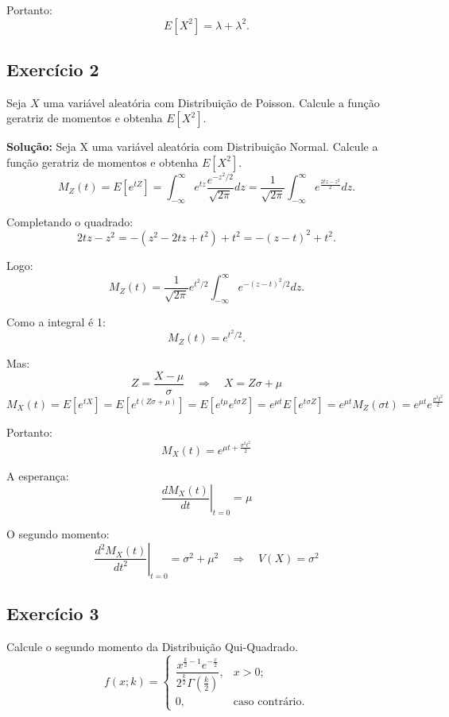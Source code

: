\documentclass{article}
\begin{document}
Portanto:
    $$
    E[X^2] = \lambda + \lambda^2.
    $$

\subsection{Exercício 2}
Seja $X$ uma variável aleatória com Distribuição de Poisson. Calcule a função geratriz de momentos e obtenha $E[X^2]$.

\vspace{0.5cm}
\textbf{Solução:} 
Seja X uma variável aleatória com Distribuição Normal. Calcule a função geratriz de momentos e obtenha $E[X^2]$.
    $$
    M_Z(t) = E[e^{tZ}] 
    = \int_{-\infty}^{\infty} e^{tz} \frac{e^{-z^2/2}}{\sqrt{2\pi}} dz
    = \frac{1}{\sqrt{2\pi}} \int_{-\infty}^{\infty} 
    e^{\frac{2tz - z^2}{2}} dz.
    $$

Completando o quadrado:
    $$
    2tz - z^2 = -\left(z^2 - 2tz + t^2\right) + t^2
    = -\left(z - t\right)^2 + t^2.
    $$

Logo:
    $$
    M_Z(t) = \frac{1}{\sqrt{2\pi}} e^{t^2/2} 
    \int_{-\infty}^{\infty} e^{-(z-t)^2/2} dz.
    $$

Como a integral é 1:
    $$
    M_Z(t) = e^{t^2/2}.
    $$

Mas:
    $$
    Z = \frac{X - \mu}{\sigma} \quad \Rightarrow \quad X = Z\sigma + \mu
    $$
    $$
    M_X(t) = E[e^{tX}] 
    = E\left[e^{t(Z\sigma + \mu)}\right] 
    = E\left[e^{t\mu} e^{t\sigma Z}\right]
    = e^{\mu t} E\left[e^{t\sigma Z}\right]
    = e^{\mu t} M_Z(\sigma t)
    = e^{\mu t} e^{\frac{\sigma^2 t^2}{2}}
    $$

Portanto:
    $$
    M_X(t) = e^{\mu t + \frac{\sigma^2 t^2}{2}}
    $$

A esperança:
    $$
    \left.\frac{d M_X(t)}{dt}\right|_{t=0} = \mu
    $$

O segundo momento:
    $$
    \left.\frac{d^2 M_X(t)}{dt^2}\right|_{t=0} 
    = \sigma^2 + \mu^2 
    \quad\Rightarrow\quad
    V(X) = \sigma^2
    $$

\subsection{Exercício 3}
Calcule o segundo momento da Distribuição Qui-Quadrado.
    $$
    f(x; k) = 
    \begin{cases}
    \dfrac{x^{\frac{k}{2}-1} e^{-\frac{x}{2}}}{2^{\frac{k}{2}} \Gamma\left(\frac{k}{2}\right)}, & x > 0; \\
    0, & \text{caso contrário}.
    \end{cases}
    $$
\end{document}
